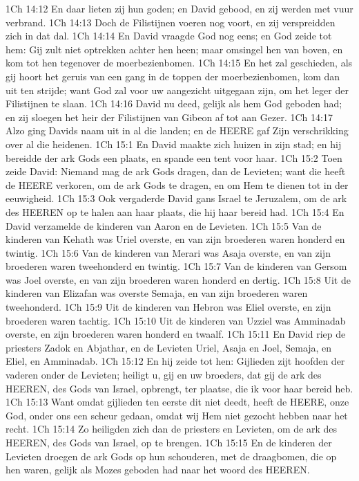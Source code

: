 1Ch 14:12  En daar lieten zij hun goden; en David gebood, en zij werden met vuur verbrand.
1Ch 14:13  Doch de Filistijnen voeren nog voort, en zij verspreidden zich in dat dal.
1Ch 14:14  En David vraagde God nog eens; en God zeide tot hem: Gij zult niet optrekken achter hen heen; maar omsingel hen van boven, en kom tot hen tegenover de moerbezienbomen.
1Ch 14:15  En het zal geschieden, als gij hoort het geruis van een gang in de toppen der moerbezienbomen, kom dan uit ten strijde; want God zal voor uw aangezicht uitgegaan zijn, om het leger der Filistijnen te slaan.
1Ch 14:16  David nu deed, gelijk als hem God geboden had; en zij sloegen het heir der Filistijnen van Gibeon af tot aan Gezer.
1Ch 14:17  Alzo ging Davids naam uit in al die landen; en de HEERE gaf Zijn verschrikking over al die heidenen.
1Ch 15:1  En David maakte zich huizen in zijn stad; en hij bereidde der ark Gods een plaats, en spande een tent voor haar.
1Ch 15:2  Toen zeide David: Niemand mag de ark Gods dragen, dan de Levieten; want die heeft de HEERE verkoren, om de ark Gods te dragen, en om Hem te dienen tot in der eeuwigheid.
1Ch 15:3  Ook vergaderde David gans Israel te Jeruzalem, om de ark des HEEREN op te halen aan haar plaats, die hij haar bereid had.
1Ch 15:4  En David verzamelde de kinderen van Aaron en de Levieten.
1Ch 15:5  Van de kinderen van Kehath was Uriel overste, en van zijn broederen waren honderd en twintig.
1Ch 15:6  Van de kinderen van Merari was Asaja overste, en van zijn broederen waren tweehonderd en twintig.
1Ch 15:7  Van de kinderen van Gersom was Joel overste, en van zijn broederen waren honderd en dertig.
1Ch 15:8  Uit de kinderen van Elizafan was overste Semaja, en van zijn broederen waren tweehonderd.
1Ch 15:9  Uit de kinderen van Hebron was Eliel overste, en zijn broederen waren tachtig.
1Ch 15:10  Uit de kinderen van Uzziel was Amminadab overste, en zijn broederen waren honderd en twaalf.
1Ch 15:11  En David riep de priesters Zadok en Abjathar, en de Levieten Uriel, Asaja en Joel, Semaja, en Eliel, en Amminadab.
1Ch 15:12  En hij zeide tot hen: Gijlieden zijt hoofden der vaderen onder de Levieten; heiligt u, gij en uw broeders, dat gij de ark des HEEREN, des Gods van Israel, opbrengt, ter plaatse, die ik voor haar bereid heb.
1Ch 15:13  Want omdat gijlieden ten eerste dit niet deedt, heeft de HEERE, onze God, onder ons een scheur gedaan, omdat wij Hem niet gezocht hebben naar het recht.
1Ch 15:14  Zo heiligden zich dan de priesters en Levieten, om de ark des HEEREN, des Gods van Israel, op te brengen.
1Ch 15:15  En de kinderen der Levieten droegen de ark Gods op hun schouderen, met de draagbomen, die op hen waren, gelijk als Mozes geboden had naar het woord des HEEREN.
